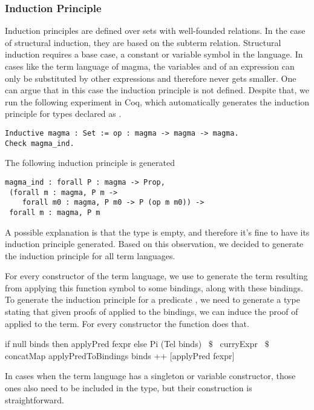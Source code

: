\subsubsection{Induction Principle}
\label{sec:generation:induction}
Induction principles are defined over sets with well-founded relations. In the case of structural induction, they are based on the subterm relation. Structural induction requires a base case, a constant or variable symbol in the language. In cases like the  term language of magma, the variables  and  of an expression  can only be substituted by other  expressions and therefore never gets smaller. One can argue that in this case the induction principle is not defined. Despite that, we run the following experiment in Coq, which automatically generates the induction principle for types declared as . 
 \begin{verbatim}
Inductive magma : Set := op : magma -> magma -> magma.
Check magma_ind.
\end{verbatim}
The following induction principle is generated 
\begin{verbatim}
magma_ind : forall P : magma -> Prop,
 (forall m : magma, P m ->
    forall m0 : magma, P m0 -> P (op m m0)) ->
 forall m : magma, P m
\end{verbatim}
\noindent A possible explanation is that the type  is empty, and therefore it's fine to have its induction principle generated. Based on this observation, 
we decided to generate the induction principle for all term languages. 

For every constructor of the term language, we use  to generate the term resulting from applying this function symbol to some bindings, along with these bindings. To generate the induction principle for a predicate , we need to generate a type stating that given proofs of  applied to the bindings, we can induce the proof of  applied to the term. For every constructor the function  does that. 
\begin{hscode} 
 if null binds then applyPred fexpr
 else Pi (Tel binds) ~$\$$~
         curryExpr ~$\$$~ concatMap applyPredToBindings binds 
                     ++ [applyPred fexpr]
\end{hscode}
In cases when the term language has a singleton or variable constructor, those ones also need to be included in the type, but their construction is straightforward.  

